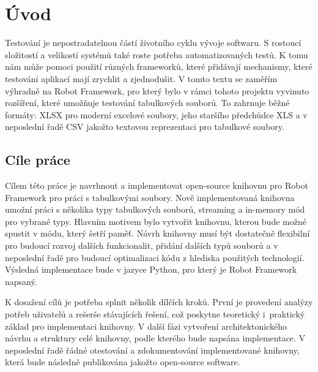 \chapter{Úvod}
\setcounter{page}{1}

Testování je nepostradatelnou částí životního cyklu vývoje softwaru. S rostoucí složitostí a velikostí systémů také roste potřeba automatizovaných testů. K tomu nám může pomoci použití různých frameworků, které přidávají mechanismy, které testování aplikací mají zrychlit a zjednodušit. V tomto textu se zaměřím výhradně na Robot Framework, pro který bylo v rámci tohoto projektu vyvinuto rozšíření, které umožňuje testování tabulkových souborů. To zahrnuje běžné formáty: XLSX pro moderní excelové soubory, jeho staršího předchůdce XLS a v neposlední řadě CSV jakožto textovou reprezentaci pro tabulkové soubory.

\section{Cíle práce}

Cílem této práce je navrhnout a implementovat open-source knihovnu pro Robot Framework pro práci s tabulkovými soubory. Nově implementovaná knihovna umožní práci s několika typy tabulkových souborů, streaming a in-memory mód pro vybrané typy. Hlavním motivem bylo vytvořit knihovnu, kterou bude možné spustit v módu, který šetří paměť. Návrh knihovny musí být dostatečně flexibilní pro budoucí rozvoj dalších funkcionalit, přidání dalších typů souborů a v neposlední řadě pro budoucí optimalizaci kódu z hlediska použitých technologií. Výsledná implementace bude v jazyce Python, pro který je Robot Framework napsaný.

K dosažení cílů je potřeba splnit několik dílčích kroků. První je provedení analýzy potřeb uživatelů a rešerše stávajících řešení, což poskytne teoretický i~praktický základ pro implementaci knihovny. V další fázi vytvoření architektonického návrhu a struktury celé knihovny, podle kterého bude napsána implementace. V neposlední řadě řádné otestování a zdokumentování implementované knihovny, která bude následně publikována jakožto open-source software.

